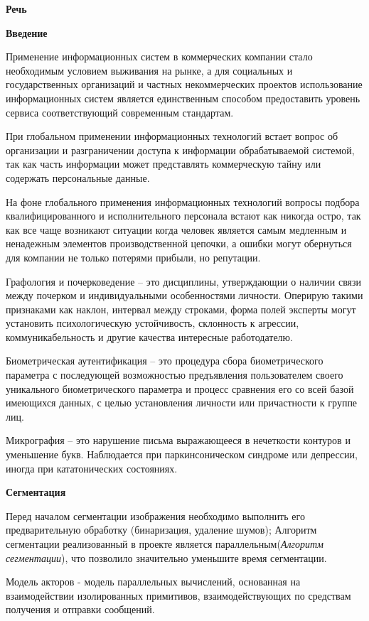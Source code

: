 \small\selectfont
{\large\bfseries Речь}

\textbf{Введение}
\bigskip

Применение информационных систем в коммерческих компании стало необходимым условием выживания на рынке, а для социальных и государственных организаций и частных некоммерческих проектов использование информационных систем является единственным способом предоставить уровень сервиса соответствующий современным стандартам. 

При глобальном применении информационных технологий встает вопрос об организации и разграничении доступа к информации обрабатываемой системой, так как часть информации может представлять коммерческую тайну или содержать персональные данные.

На фоне глобального применения информационных технологий вопросы подбора квалифицированного и исполнительного персонала встают как никогда остро, так как все чаще возникают ситуации когда человек является самым медленным и ненадежным элементов производственной цепочки, а ошибки могут обернуться для компании не только потерями прибыли, но репутации.

Графология и почерковедение – это дисциплины, утверждающии о наличии связи между почерком и индивидуальными особенностями личности. Оперирую такими признаками как наклон, интервал между строками, форма полей эксперты могут установить психологическую устойчивость, склонность к агрессии, коммуникабельность и другие качества интересные работодателю.

Биометрическая аутентификация -- это процедура сбора биометрического параметра с последующей возможностью предъявления пользователем своего уникального биометрического параметра и процесс сравнения его со всей базой имеющихся данных, с целью установления личности или причастности к группе лиц.

Микрография -- это нарушение письма выражающееся в нечеткости контуров и уменьшение букв. Наблюдается при паркинсоническом синдроме или депрессии, иногда при кататонических состояниях.

\textbf{Сегментация}
\bigskip

Перед началом сегментации изображения необходимо выполнить его предварительную обработку (бинаризация, удаление шумов);
Алгоритм сегментации реализованный в проекте является параллельным(\emph{Алгоритм сегментации}), что позволило значительно уменьшите время сегментации. 

Модель акторов - модель параллельных вычислений, основанная на взаимодействии изолированных примитивов, взаимодействующих по средствам получения и отправки сообщений. 

